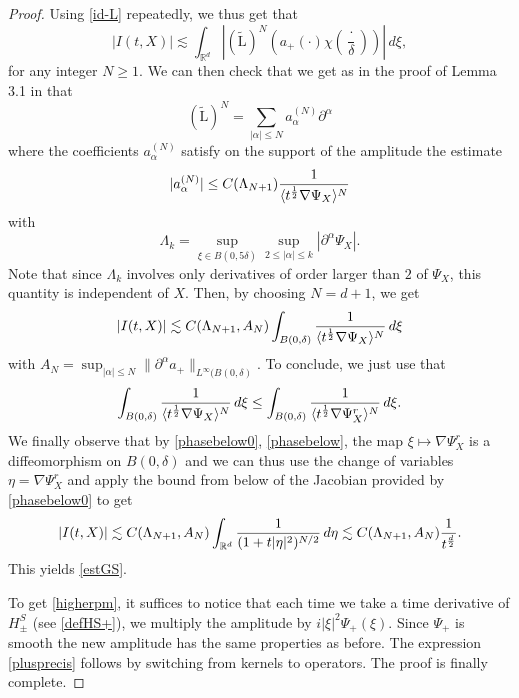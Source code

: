 \documentclass[11pt]{amsart}
\numberwithin{equation}{section}
\begin{document}
\begin{proof}
Using \eqref{id-L} repeatedly, we thus get  that
$$ |I(t, X) | \lesssim \int_{\mathbb{R}^d} \left|(\widetilde{\mathrm{L}})^N \left( a_{+} (\cdot)\chi\left(\frac{\cdot}{\delta}\right)\right) \right|\, d\xi,$$
for any integer $N\ge 1$. 
 We can then  check that we  get as in the proof of  Lemma 3.1 in  \cite{Farah-Rousset-Tzvetkov}
  that  
  $$(\widetilde{\mathrm{L}})^N = \sum_{ | \alpha | \leq N} a_{\alpha}^{(N)} \partial^\alpha$$
   where the coefficients $a_{\alpha}^{(N)}$ satisfy on the support of the amplitude  the estimate
   $$ |  a_{\alpha}^{(N)}| \leq C( \Lambda_{N+1}) { 1  \over   \langle t^{ 1\over 2}  \nabla \Psi_{X} \rangle^{N}}$$ with
   $$ \Lambda_{k}= \sup_{\xi \in B(0, 5 \delta)} \sup_{ 2 \leq | \alpha | \leq k} | \partial^\alpha \Psi_{X}|.$$
   Note that since $\Lambda_{k}$ involves only derivatives of order larger than $2$ of $\Psi_{X}$, this quantity
    is independent of $X$. 
    Then, by choosing $N = d+ 1 $, we get
    $$  |I(t, X) | \lesssim  C( \Lambda_{N+1}, A_{N}) \int_{B(0, \delta)}   { 1  \over   \langle t^{ 1\over 2}  \nabla \Psi_{X} \rangle^N} \, d\xi$$
    with $A_{N} = \sup_{|\alpha | \leq N} \|\partial^\alpha a_{+}\|_{L^\infty(B(0, \delta)}.$
     To conclude, we just use that
     $$    \int_{B(0, \delta)}   { 1  \over   \langle t^{ 1\over 2}  \nabla \Psi_{X} \rangle^{N}} \, d\xi
      \leq \int_{B(0, \delta)}   { 1  \over   \langle t^{ 1\over 2}  \nabla \Psi_{X}^r \rangle^{N}} \, d\xi.
$$
We finally observe that by \eqref{phasebelow0}, \eqref{phasebelow}, the map $\xi \mapsto \nabla \Psi^r_{X}$ is a diffeomorphism on $B(0, \delta)$
 and we can thus use the change of variables $\eta = \nabla\Psi^r_{X}$ and apply the bound from below of the Jacobian provided
 by \eqref{phasebelow0} to get
 $$    |I(t, X) | \lesssim  C( \Lambda_{N+1}, A_{N}) \int_{\mathbb{R}^d} { 1 \over (1 + t |\eta|^2)^{N/2} }
 \, d \eta  \lesssim   C( \Lambda_{N+1}, A_{N}) { 1 \over t^{d\over2}}.$$
This yields \eqref{estGS}. 

    To get \eqref{higherpm}, it suffices to notice that each time we take a time derivative of $H^S_{\pm}$ (see
     \eqref{defHS+}), we multiply the amplitude by $i |\xi|^2 \Psi_{+}(\xi)$. Since $\Psi_{+}$ is smooth the new amplitude
    has the same properties as before. The expression \eqref{plusprecis} follows by switching from kernels to operators. The proof is finally complete.
     \end{proof}
\end{document}
